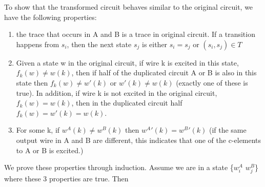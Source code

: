 \documentclass{article}
\begin{document}
To show that the transformed circuit behaves similar to the original circuit, we have the following properties:
\begin{enumerate} %
\item  the trace that occurs in A and B is a trace in original circuit.  If a transition happens from $s_i$, then the next state $s_j$ is either $s_i=s_j$ or $(s_i,s_j) \in T$  %
\item  Given a state w in the original circuit, if wire k is excited in this state, $f_k(w)\neq w(k)$, then if half of the duplicated circuit A or B is also in this state then $f_k(w) \neq w'(k)$ or $w'(k) \neq w(k)$ (exactly one of these is true).  
In addition, if wire k is not excited in the original circuit, $f_k(w)=w(k)$, then in the duplicated circuit half $f_k(w)=w'(k)=w(k)$.  %
\item  For some k, if $w^A(k)\neq w^B(k)$ then $w^A'(k)=w^B'(k)$ (if the same output wire in A and B are different, this indicates that one of the c-elements to A or B is excited.)
\end{enumerate}
We prove these properties through induction.  Assume we are in a state \{$w_i^A$ $w_j^B$\} where these 3 properties are true.  Then 
\end{document}
